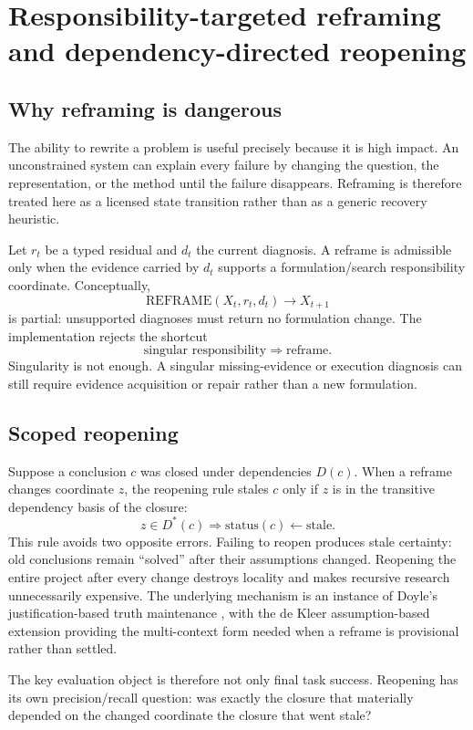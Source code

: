 \section{Responsibility-targeted reframing and dependency-directed reopening}

\subsection{Why reframing is dangerous}

The ability to rewrite a problem is useful precisely because it is high impact. An unconstrained system can explain every failure by changing the question, the representation, or the method until the failure disappears. Reframing is therefore treated here as a licensed state transition rather than as a generic recovery heuristic.

Let $r_t$ be a typed residual and $d_t$ the current diagnosis. A reframe is admissible only when the evidence carried by $d_t$ supports a formulation/search responsibility coordinate. Conceptually,
\[
\mathrm{REFRAME}(X_t,r_t,d_t)
\rightarrow X_{t+1}
\]
is partial: unsupported diagnoses must return no formulation change. The implementation rejects the shortcut
\[
\text{singular responsibility}\Rightarrow\text{reframe}.
\]
Singularity is not enough. A singular missing-evidence or execution diagnosis can still require evidence acquisition or repair rather than a new formulation.

\subsection{Scoped reopening}

Suppose a conclusion $c$ was closed under dependencies $D(c)$. When a reframe changes coordinate $z$, the reopening rule stales $c$ only if $z$ is in the transitive dependency basis of the closure:
\[
z\in D^{*}(c)\Rightarrow \mathrm{status}(c)\leftarrow \text{stale}.
\]
This rule avoids two opposite errors. Failing to reopen produces stale certainty: old conclusions remain ``solved'' after their assumptions changed. Reopening the entire project after every change destroys locality and makes recursive research unnecessarily expensive. The underlying mechanism is an instance of Doyle's justification-based truth maintenance \cite{doyle1979}, with the de Kleer assumption-based extension \cite{dekleer1986} providing the multi-context form needed when a reframe is provisional rather than settled.

The key evaluation object is therefore not only final task success. Reopening has its own precision/recall question: was exactly the closure that materially depended on the changed coordinate the closure that went stale?

